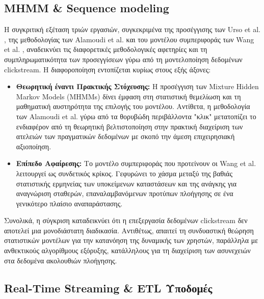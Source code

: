 \documentclass[12pt,a4paper]{article}
\begin{document}
	
	\subsection{MHMM \& Sequence modeling}
	
	Η συγκριτική εξέταση τριών εργασιών, συγκεκριμένα της προσέγγισης των Urso et al. \cite{MMHM}, της μεθοδολογίας των Alamoudi et al. \cite{clickstream2022} και του μοντέλου συμπεριφοράς των Wang et al. \cite{ClickstreamUserBehaviorModels}, αναδεικνύει τις διαφορετικές μεθοδολογικές αφετηρίες και τη συμπληρωματικότητα των προσεγγίσεων γύρω από τη μοντελοποίηση δεδομένων clickstream. Η διαφοροποίηση εντοπίζεται κυρίως στους εξής άξονες:
	
	\begin{itemize}
		\item \textbf{Θεωρητική έναντι Πρακτικής Στόχευσης:} Η προσέγγιση των Mixture Hidden Markov Models (MHMMs) \cite{MMHM} δίνει έμφαση στη στατιστική θεμελίωση και τη μαθηματική αυστηρότητα της επιλογής του μοντέλου. Αντίθετα, η μεθοδολογία των Alamoudi et al. \cite{clickstream2022} γύρω από τα θορυβώδη περιβάλλοντα "κλικ" μετατοπίζει το ενδιαφέρον από τη θεωρητική βελτιστοποίηση στην πρακτική διαχείριση των ατελειών των πραγματικών δεδομένων με σκοπό την άμεση επιχειρησιακή αξιοποίηση.
		\item \textbf{Επίπεδο Αφαίρεσης:} Το μοντέλο συμπεριφοράς που προτείνουν οι Wang et al. \cite{ClickstreamUserBehaviorModels} λειτουργεί ως συνδετικός κρίκος. Γεφυρώνει το χάσμα μεταξύ της βαθιάς στατιστικής ερμηνείας των υποκείμενων καταστάσεων \cite{MMHM} και της ανάγκης για αναγνώριση σταθερών, επαναλαμβανόμενων προτύπων πλοήγησης \cite{clickstream2022} σε ένα γενικότερο πλαίσιο αναπαράστασης.
	\end{itemize}
	
	Συνολικά, η σύγκριση καταδεικνύει ότι η επεξεργασία δεδομένων clickstream δεν αποτελεί μια μονοδιάστατη διαδικασία. Αντιθέτως, απαιτεί τη συνδυαστική θεώρηση στατιστικών μοντέλων για την κατανόηση της δυναμικής των χρηστών, παράλληλα με ανθεκτικούς αλγορίθμους εξόρυξης, κατάλληλους για τη διαχείριση των ασυνεχειών στα δεδομένα ακολουθιών πλοήγησης.
	
	\subsection{Real-Time Streaming \& ETL Υποδομές}
	
\end{document}
